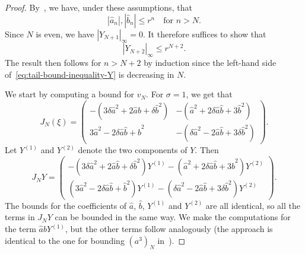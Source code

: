 \documentclass[11pt]{article}
\begin{document}
\begin{proof}
  By~\cite[Lemma~8.1]{Dahne2024}, we have, under these assumptions,
  that
  \begin{equation*}
    |\hat{a}_{n}|, |\hat{b}_{n}| \leq r^{n} \quad\text{for } n > N.
  \end{equation*}
  Since \(N\) is even, we have \(|Y_{N + 1}|_{\infty} = 0\). It
  therefore suffices to show that
  \begin{equation*}
    |Y_{N + 2}|_{\infty} \leq r^{N + 2}.
  \end{equation*}
  The result then follows for \(n > N + 2\) by induction since the
  left-hand side of~\eqref{eq:tail-bound-inequality-Y} is decreasing
  in \(N\).

  We start by computing a bound for \(v_{N}\). For \(\sigma = 1\), we
  get that
  \begin{equation*}
    J_{N}(\xi) =
    \begin{pmatrix}
      -(3\delta \hat{a}^{2} + 2\hat{a}\hat{b} + \delta \hat{b}^{2}) & -(\hat{a}^{2} + 2\delta \hat{a}\hat{b} + 3\hat{b}^{2})\\
      3\hat{a}^{2} - 2\delta \hat{a}\hat{b} + \hat{b}^{2} & -(\delta \hat{a}^{2} - 2\hat{a}\hat{b} + 3\delta \hat{b}^{2})
    \end{pmatrix}.
  \end{equation*}
  Let \(Y^{(1)}\) and \(Y^{(2)}\) denote the two components of \(Y\).
  Then
  \begin{equation*}
    J_{N}Y =
    \begin{pmatrix}
      -(3\delta \hat{a}^{2} + 2\hat{a}\hat{b} + \delta \hat{b}^{2})Y^{(1)} - (\hat{a}^{2} + 2\delta \hat{a}\hat{b} + 3\hat{b}^{2})Y^{(2)}\\
      (3\hat{a}^{2} - 2\delta \hat{a}\hat{b} + \hat{b}^{2})Y^{(1)} - (\delta \hat{a}^{2} - 2\hat{a}\hat{b} + 3\delta \hat{b}^{2})Y^{(2)}
    \end{pmatrix}.
  \end{equation*}
  The bounds for the coefficients of \(\hat{a}\), \(\hat{b}\),
  \(Y^{(1)}\) and \(Y^{(2)}\) are all identical, so all the terms in
  \(J_{N}Y\) can be bounded in the same way. We make the computations
  for the term \(\hat{a}\hat{b}Y^{(1)}\), but the other terms follow
  analogously (the approach is identical to the one for bounding
  \((a^{3})_{N}\) in~\cite[Lemma~8.1]{Dahne2024}).


\end{proof}
\end{document}
